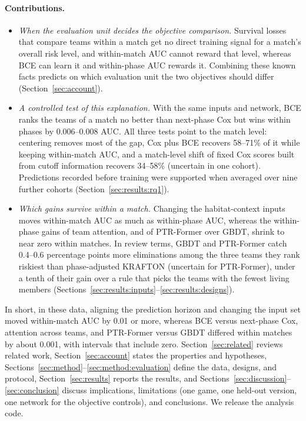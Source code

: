 \documentclass[sigconf,anonymous]{acmart}
\begin{document}
\paragraph{Contributions.}
\begin{itemize}
\item \emph{When the evaluation unit decides the objective comparison.} Survival losses that compare teams within a match get no direct training signal for a match's overall risk level, and within-match AUC cannot reward that level, whereas BCE can learn it and within-phase AUC rewards it. Combining these known facts predicts on which evaluation unit the two objectives should differ (Section~\ref{sec:account}).
\item \emph{A controlled test of this explanation.} With the same inputs and network, BCE ranks the teams of a match no better than next-phase Cox but wins within phases by 0.006--0.008 AUC. All three tests point to the match level: centering removes most of the gap, Cox plus BCE recovers 58--71\% of it while keeping within-match AUC, and a match-level shift of fixed Cox scores built from cutoff information recovers 34--58\% (uncertain in one cohort). Predictions recorded before training were supported when averaged over nine further cohorts (Section~\ref{sec:results:rq1}).
\item \emph{Which gains survive within a match.} Changing the habitat-context inputs moves within-match AUC as much as within-phase AUC, whereas the within-phase gains of team attention, and of PTR-Former over GBDT, shrink to near zero within matches. In review terms, GBDT and PTR-Former catch 0.4--0.6 percentage points more eliminations among the three teams they rank riskiest than phase-adjusted KRAFTON (uncertain for PTR-Former), under a tenth of their gain over a rule that picks the teams with the fewest living members (Sections~\ref{sec:results:inputs}--\ref{sec:results:designs}).
\end{itemize}
In short, in these data, aligning the prediction horizon and changing the input set moved within-match AUC by 0.01 or more, whereas BCE versus next-phase Cox, attention across teams, and PTR-Former versus GBDT differed within matches by about 0.001, with intervals that include zero.
Section~\ref{sec:related} reviews related work, Section~\ref{sec:account} states the properties and hypotheses, Sections~\ref{sec:method}--\ref{sec:method:evaluation} define the data, designs, and protocol, Section~\ref{sec:results} reports the results, and Sections~\ref{sec:discussion}--\ref{sec:conclusion} discuss implications, limitations (one game, one held-out version, one network for the objective controls), and conclusions. We release the analysis code.
\end{document}
